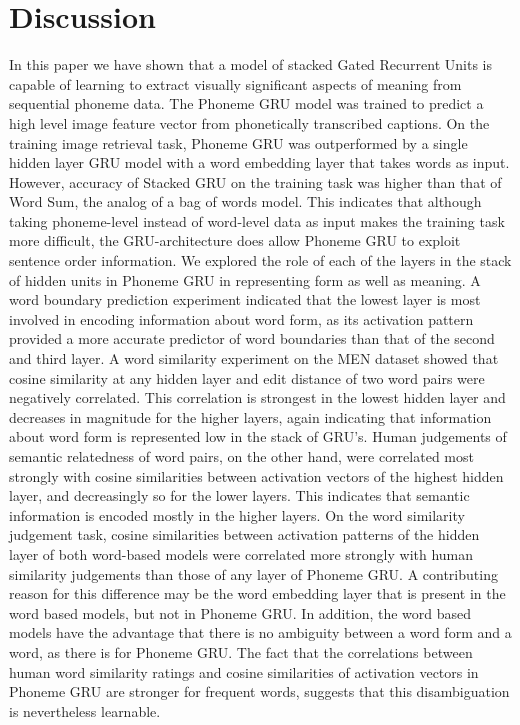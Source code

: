 \section{Discussion}
\label{sec:discussion}
In this paper we have shown that a model of stacked Gated Recurrent Units is capable of learning to extract visually significant aspects of meaning from sequential phoneme data. The {\sc Phoneme GRU} model was trained to predict a high level image feature vector from phonetically transcribed captions. On the training image retrieval task, {\sc Phoneme GRU} was outperformed by a single hidden layer GRU model with a word embedding layer that takes words as input. However, accuracy of {\sc Stacked GRU} on the training task was higher than that of {\sc Word Sum}, the analog of a bag of words model. This indicates that although taking phoneme-level instead of word-level data as input makes the training task more difficult, the GRU-architecture does allow {\sc Phoneme GRU} to exploit sentence order information.
We explored the role of each of the layers in the stack of hidden units in {\sc Phoneme GRU} in representing form as well as meaning. A word boundary prediction experiment indicated that the lowest layer is most involved in encoding information about word form, as its activation pattern provided a more accurate predictor of word boundaries than that of the second and third layer. A word similarity experiment on the MEN dataset showed that cosine similarity at any hidden layer and edit distance of two word pairs were negatively correlated. This correlation is strongest in the lowest hidden layer and decreases in magnitude for the higher layers, again indicating that information about word form is represented low in the stack of GRU's.
Human judgements of semantic relatedness of word pairs, on the other hand, were correlated most strongly with cosine similarities between activation vectors of the highest hidden layer, and decreasingly so for the lower layers. This indicates that semantic information is encoded mostly in the higher layers. On the word similarity judgement task, cosine similarities between activation patterns of the hidden layer of both word-based models were correlated more strongly with human similarity judgements than those of any layer of {\sc Phoneme GRU}. A contributing reason for this difference may be the word embedding layer that is present in the word based models, but not in {\sc Phoneme GRU}. In addition, the word based models have the advantage that there is no ambiguity between a word form and a word, as there is for {\sc Phoneme GRU}. The fact that the correlations between human word similarity ratings and cosine similarities of activation vectors in {\sc Phoneme GRU} are stronger for frequent words, suggests that this disambiguation is nevertheless learnable.
